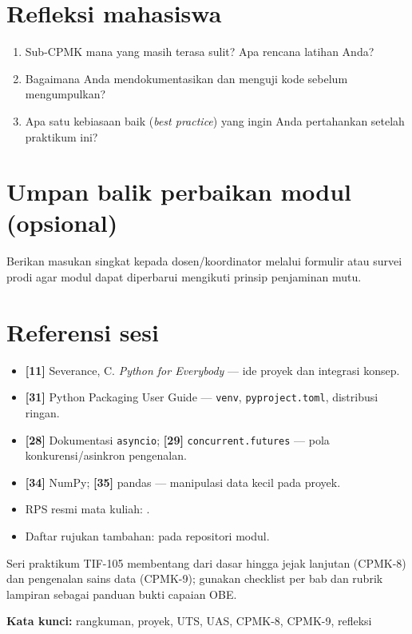 \documentclass[../main.tex]{subfiles}
\begin{document}
\section{Refleksi mahasiswa}

\begin{enumerate}[leftmargin=*]
  \item Sub-CPMK mana yang masih terasa sulit? Apa rencana latihan Anda?
  \item Bagaimana Anda mendokumentasikan dan menguji kode sebelum mengumpulkan?
  \item Apa satu kebiasaan baik (\textit{best practice}) yang ingin Anda pertahankan setelah praktikum ini?
\end{enumerate}

\section{Umpan balik perbaikan modul (opsional)}

Berikan masukan singkat kepada dosen/koordinator melalui formulir atau survei prodi agar modul dapat diperbarui mengikuti prinsip penjaminan mutu.

\section{Referensi sesi}

\begin{itemize}[leftmargin=*]
  \item \textbf{[11]} Severance, C. \textit{Python for Everybody} --- ide proyek dan integrasi konsep.
  \item \textbf{[31]} Python Packaging User Guide --- \texttt{venv}, \texttt{pyproject.toml}, distribusi ringan.
  \item \textbf{[28]} Dokumentasi \texttt{asyncio}; \textbf{[29]} \texttt{concurrent.futures} --- pola konkurensi/asinkron pengenalan.
  \item \textbf{[34]} NumPy; \textbf{[35]} pandas --- manipulasi data kecil pada proyek.
  \item RPS resmi mata kuliah: .
  \item Daftar rujukan tambahan:  pada repositori modul.
\end{itemize}

\begin{rangkuman}
Seri praktikum TIF-105 membentang dari dasar hingga jejak lanjutan (CPMK-8) dan pengenalan sains data (CPMK-9); gunakan checklist per bab dan rubrik lampiran sebagai panduan bukti capaian OBE.

\textbf{Kata kunci:} rangkuman, proyek, UTS, UAS, CPMK-8, CPMK-9, refleksi
\end{rangkuman}
\end{document}
